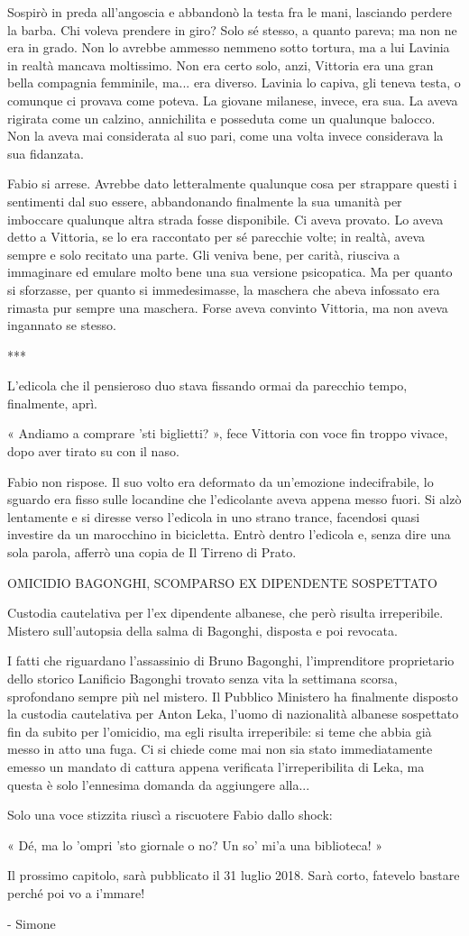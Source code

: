 Sospirò in preda all'angoscia e abbandonò la testa fra le mani, lasciando perdere la barba. Chi voleva prendere in giro? Solo sé stesso, a quanto pareva; ma non ne era in grado. Non lo avrebbe ammesso nemmeno sotto tortura, ma a lui Lavinia in realtà mancava moltissimo. Non era certo solo, anzi, Vittoria era una gran bella compagnia femminile, ma... era diverso. Lavinia lo capiva, gli teneva testa, o comunque ci provava come poteva. La giovane milanese, invece, era sua. La aveva rigirata come un calzino, annichilita e posseduta come un qualunque balocco. Non la aveva mai considerata al suo pari, come una volta invece considerava la sua fidanzata.

Fabio si arrese. Avrebbe dato letteralmente qualunque cosa per strappare questi i sentimenti dal suo essere, abbandonando finalmente la sua umanità per imboccare qualunque altra strada fosse disponibile. Ci aveva provato. Lo aveva detto a Vittoria, se lo era raccontato per sé parecchie volte; in realtà, aveva sempre e solo recitato una parte. Gli veniva bene, per carità, riusciva a immaginare ed emulare molto bene una sua versione psicopatica. Ma per quanto si sforzasse, per quanto si immedesimasse, la maschera che abeva infossato era rimasta pur sempre una maschera. Forse aveva convinto Vittoria, ma non aveva ingannato se stesso.

***

L'edicola che il pensieroso duo stava fissando ormai da parecchio tempo, finalmente, aprì.

« Andiamo a comprare 'sti biglietti? », fece Vittoria con voce fin troppo vivace, dopo aver tirato su con il naso.

Fabio non rispose. Il suo volto era deformato da un'emozione indecifrabile, lo sguardo era fisso sulle locandine che l'edicolante aveva appena messo fuori. Si alzò lentamente e si diresse verso l'edicola in uno strano trance, facendosi quasi investire da un marocchino in bicicletta. Entrò dentro l'edicola e, senza dire una sola parola, afferrò una copia de Il Tirreno di Prato.

OMICIDIO BAGONGHI, SCOMPARSO EX DIPENDENTE SOSPETTATO

Custodia cautelativa per l'ex dipendente albanese, che però risulta irreperibile. Mistero sull'autopsia della salma di Bagonghi, disposta e poi revocata.

I fatti che riguardano l'assassinio di Bruno Bagonghi, l'imprenditore proprietario dello storico Lanificio Bagonghi trovato senza vita la settimana scorsa, sprofondano sempre più nel mistero. Il Pubblico Ministero ha finalmente disposto la custodia cautelativa per Anton Leka, l'uomo di nazionalità albanese sospettato fin da subito per l'omicidio, ma egli risulta irreperibile: si teme che abbia già messo in atto una fuga. Ci si chiede come mai non sia stato immediatamente emesso un mandato di cattura appena verificata l'irreperibilita di Leka, ma questa è solo l'ennesima domanda da aggiungere alla...

Solo una voce stizzita riuscì a riscuotere Fabio dallo shock:

« Dé, ma lo 'ompri 'sto giornale o no? Un so' mi'a una biblioteca! »

Il prossimo capitolo, sarà pubblicato il 31 luglio 2018. Sarà corto, fatevelo bastare perché poi vo a i'mmare!

- Simone



